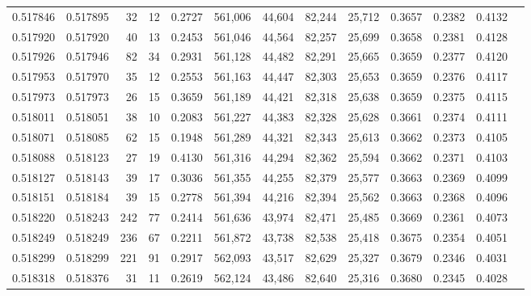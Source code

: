 \begin{tabular}{rrrrrrrrrrrrr}
0.517846 & 0.517895 &    32 &    12 &                                     0.2727 & 561,006 &  44,604 &  82,244 &  25,712 & 0.3657 & 0.2382 & 0.4132 \\
0.517920 & 0.517920 &    40 &    13 &                                     0.2453 & 561,046 &  44,564 &  82,257 &  25,699 & 0.3658 & 0.2381 & 0.4128 \\
0.517926 & 0.517946 &    82 &    34 &                                     0.2931 & 561,128 &  44,482 &  82,291 &  25,665 & 0.3659 & 0.2377 & 0.4120 \\
0.517953 & 0.517970 &    35 &    12 &                                     0.2553 & 561,163 &  44,447 &  82,303 &  25,653 & 0.3659 & 0.2376 & 0.4117 \\
0.517973 & 0.517973 &    26 &    15 &                                     0.3659 & 561,189 &  44,421 &  82,318 &  25,638 & 0.3659 & 0.2375 & 0.4115 \\
0.518011 & 0.518051 &    38 &    10 &                                     0.2083 & 561,227 &  44,383 &  82,328 &  25,628 & 0.3661 & 0.2374 & 0.4111 \\
0.518071 & 0.518085 &    62 &    15 &                                     0.1948 & 561,289 &  44,321 &  82,343 &  25,613 & 0.3662 & 0.2373 & 0.4105 \\
0.518088 & 0.518123 &    27 &    19 &                                     0.4130 & 561,316 &  44,294 &  82,362 &  25,594 & 0.3662 & 0.2371 & 0.4103 \\
0.518127 & 0.518143 &    39 &    17 &                                     0.3036 & 561,355 &  44,255 &  82,379 &  25,577 & 0.3663 & 0.2369 & 0.4099 \\
0.518151 & 0.518184 &    39 &    15 &                                     0.2778 & 561,394 &  44,216 &  82,394 &  25,562 & 0.3663 & 0.2368 & 0.4096 \\
0.518220 & 0.518243 &   242 &    77 &                                     0.2414 & 561,636 &  43,974 &  82,471 &  25,485 & 0.3669 & 0.2361 & 0.4073 \\
0.518249 & 0.518249 &   236 &    67 &                                     0.2211 & 561,872 &  43,738 &  82,538 &  25,418 & 0.3675 & 0.2354 & 0.4051 \\
0.518299 & 0.518299 &   221 &    91 &                                     0.2917 & 562,093 &  43,517 &  82,629 &  25,327 & 0.3679 & 0.2346 & 0.4031 \\
0.518318 & 0.518376 &    31 &    11 &                                     0.2619 & 562,124 &  43,486 &  82,640 &  25,316 & 0.3680 & 0.2345 & 0.4028 \\

\end{tabular}
